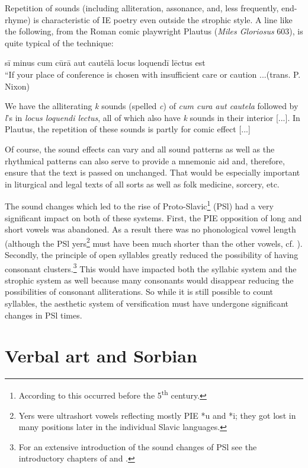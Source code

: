 \documentclass[output=paper,hidelinks]{langscibook}
\begin{document}
Repetition of sounds (including alliteration, assonance, and, less frequently, end-rhyme) is characteristic of IE poetry even outside the strophic style. A line like the following, from the Roman comic playwright Plautus (\textit{Miles Gloriosus} 603), is quite typical of the technique:

\ea
sī minus cum cūrā aut cautēlā locus loquendī lēctus est\\
“If your place of conference is chosen with insufficient care or caution ...(trans. P. Nixon)\z


We have the alliterating \textit{k} sounds (spelled \textit{c}) of \textit{cum cura aut cautela} followed by \textit{l}’s in \textit{locus loquendi lectus}, all of which also have \textit{k} sounds in their interior [...]. In Plautus, the repetition of these sounds is partly for comic effect [...] \citep[37]{Fortson2010}


 
Of course, the sound effects can vary and all sound patterns as well as the rhythmical patterns can also serve to provide a mnemonic aid and, therefore, ensure that the text is passed on unchanged. That would be especially important in liturgical and legal texts of all sorts as well as folk medicine, sorcery, etc.
 

 
The sound changes which led to the rise of Proto-Slavic\footnote{According to \citet[419]{Fortson2010} this occurred before the 5\textsuperscript{th} century.} (PSl) had a very significant impact on both of these systems. First, the PIE opposition of long and short vowels was abandoned. As a result there was no phonological vowel length (although the PSl yers\footnote{Yers were ultrashort vowels reflecting mostly PIE *u and *i; they got lost in many positions later in the individual Slavic languages.} must have been much shorter than the other vowels, cf. \citealt[48ff]{Schaarschmidt1997}). Secondly, the principle of open syllables greatly reduced the possibility of having consonant clusters.\footnote{For an extensive introduction of the sound changes of PSl see the introductory chapters of \citet{Leskien1969} and \citet{Trunte1990}.} This would have impacted both the syllabic system and the strophic system as well because many consonants would disappear reducing the possibilities of consonant alliterations. So while it is still possible to count syllables, the aesthetic system of versification must have undergone significant changes in PSl times.
 

\section{Verbal art and Sorbian}
\end{document}
